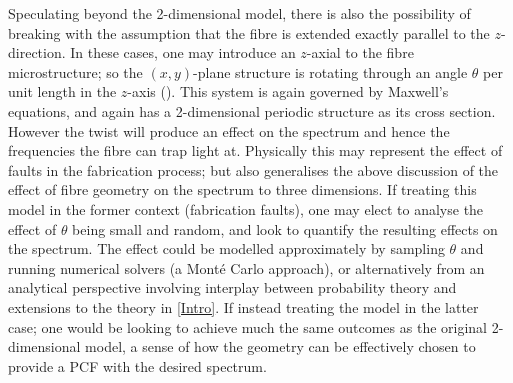 Speculating beyond the 2-dimensional model, there is also the possibility of breaking with the assumption that the fibre is extended exactly parallel to the $z$-direction.
In these cases, one may introduce an $z$-axial  to the fibre microstructure; so the $(x,y)$-plane structure is rotating through an angle $\theta$ per unit length in the $z$-axis ().
This system is again governed by Maxwell's equations, and again has a 2-dimensional periodic structure as its cross section.
However the twist will produce an effect on the spectrum and hence the frequencies the fibre can trap light at.
Physically this may represent the effect of faults in the fabrication process; but also generalises the above discussion of the effect of fibre geometry on the spectrum to three dimensions.
If treating this model in the former context (fabrication faults), one may elect to analyse the effect of $\theta$ being small and random, and look to quantify the resulting effects on the spectrum.
The effect could be modelled approximately by sampling $\theta$ and running numerical solvers (a Mont\'e Carlo approach), or alternatively from an analytical perspective involving interplay between probability theory and extensions to the theory in \cref{Intro}.
If instead treating the model in the latter case; one would be looking to achieve much the same outcomes as the original 2-dimensional model, a sense of how the geometry can be effectively chosen to provide a PCF with the desired spectrum.
